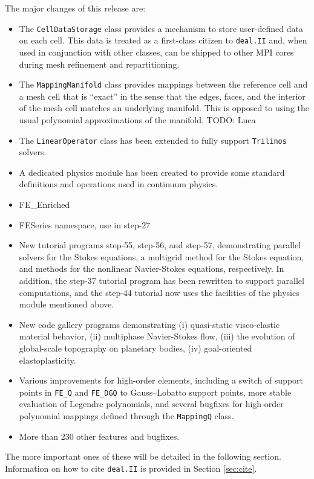 \documentclass{ansarticle-preprint}
\newcommand{\specialword}[1]{\texttt{#1}}
\newcommand{\dealii}{{\specialword{deal.II}}}
\newcommand{\trilinos}{{\specialword{Trilinos}}}
\begin{document}
The major changes of this release are:
\begin{itemize}
\item The \texttt{CellDataStorage} class provides a mechanism to store user-defined data on each cell.
This data is treated as a first-class citizen to \dealii{} and, when used in conjunction with other classes, can be shipped to other MPI cores during mesh refinement and repartitioning.

\item The \texttt{MappingManifold} class provides mappings between the
  reference cell and a mesh cell that is ``exact'' in the sense that
  the edges, faces, and the interior of the mesh cell matches an
  underlying manifold. This is opposed to using the usual polynomial
  approximations of the manifold.
  TODO: Luca

\item The \texttt{LinearOperator} class has been extended to fully support {\trilinos} solvers.

\item A dedicated physics module has been created to provide some standard definitions and operations used in continuum physics.

\item FE\_Enriched

\item FESeries namespace, use in step-27

\item New tutorial programs step-55, step-56, and step-57,
  demonstrating parallel solvers for the Stokes equations, a multigrid
  method for the Stokes equation, and methods for the nonlinear
  Navier-Stokes equations, respectively. In addition, the step-37
  tutorial program has been rewritten to support parallel
  computations, and the step-44 tutorial now uses the facilities of
  the physics module mentioned above.

\item New code gallery programs demonstrating (i) quasi-static
  visco-elastic material behavior, (ii) multiphase Navier-Stokes flow,
  (iii) the evolution of global-scale topography on planetary bodies,
  (iv) goal-oriented elastoplasticity.

\item Various improvements for high-order elements, including a switch of
  support points in \texttt{FE\_Q} and \texttt{FE\_DGQ} to Gauss--Lobatto
  support points, more stable evaluation of Legendre polynomials, and several
  bugfixes for high-order polynomial mappings defined through the
  \texttt{MappingQ} class.


\item More than 230 other features and bugfixes.
\end{itemize}
The more important ones of these will be detailed in the following section.
Information on how to cite \dealii{} is provided in Section \ref{sec:cite}.
\end{document}
